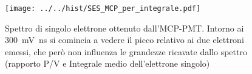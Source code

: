 \begin{figure}[h] \centering \texttt{[image: ../../hist/SES\_MCP\_per\_integrale.pdf]}\caption{Spettro di singolo elettrone ottenuto dall'MCP-PMT. Intorno ai \SI{300}{\milli\volt\nano\second} si comincia a vedere il picco relativo ai due elettroni emessi, che però non influenza le grandezze ricavate dallo spettro (rapporto P/V e Integrale medio dell'elettrone singolo)}\label{hist:SES_MCP_per_integrale} \end{figure}
